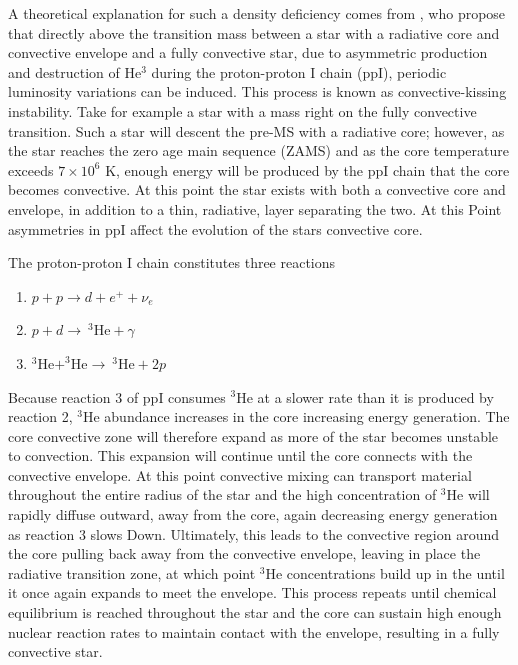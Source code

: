 A theoretical explanation for such a density deficiency comes from
\citet{van2012}, who propose that directly above the transition mass between a
star with a radiative core and convective envelope and a fully convective star,
due to asymmetric production and destruction of He$^{3}$ during the
proton-proton I chain (ppI), periodic luminosity variations can be induced.
This process is known as convective-kissing instability.  Take for example a
star with a mass right on the fully convective transition.  Such a star will
descent the pre-MS with a radiative core; however, as the star reaches the zero
age main sequence (ZAMS) and as the core temperature exceeds $7\times 10^{6}$
K, enough energy will be produced by the ppI chain that the core becomes
convective. At this point the star exists with both a convective core and
envelope, in addition to a thin, radiative, layer separating the two. At this
Point asymmetries in ppI affect the evolution of the stars convective core.

The proton-proton I chain constitutes three reactions 
\begin{enumerate} 
	\item $p + p \longrightarrow d + e^{+} + \nu_{e}$
	\item $p + d \longrightarrow \ ^{3}\text{He} + \gamma$
	\item $^{3}\text{He} + ^{3}\text{He} \longrightarrow \ ^{3}\text{He} + 2p$ 
\end{enumerate} 
Because reaction 3 of ppI consumes $^{3}$He at a slower rate than it is
produced by reaction 2, $^{3}$He abundance increases in the core increasing
energy generation. The core convective zone will therefore expand as more of
the star becomes unstable to convection. This expansion will continue until the
core connects with the convective envelope. At this point convective mixing can
transport material throughout the entire radius of the star and the high
concentration of $^{3}$He will rapidly diffuse outward, away from the core,
again decreasing energy generation as reaction 3 slows Down. Ultimately, this
leads to the convective region around the core pulling back away from the
convective envelope, leaving in place the radiative transition zone, at which
point $^{3}$He concentrations build up in the until it once again expands to
meet the envelope.  This process repeats until chemical equilibrium is reached
throughout the star and the core can sustain high enough nuclear reaction rates
to maintain contact with the envelope, resulting in a fully convective star.


